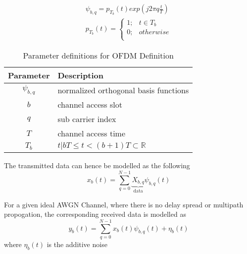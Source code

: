         \begin{equation} \label{eq:OFDM}
            \begin{split}
                \psi_{b,q} = p_{T_{b}}(t)exp(j2{\pi}q{\frac{t}{T}}) \\
                p_{T_{b}}(t) = \left\{
                    \begin{matrix}
                        1; & t \in T_b \\
                        0; & otherwise \\
                    \end{matrix}\right.
            \end{split}
        \end{equation}

        \begin{table}[H]
            \begin{center}
                \begin{tabular}{|c|l|}
                    \hline
                    Parameter& Description\\ \hline
                    $\psi_{b,q}$& normalized orthogonal basis functions\\ \hline
                    $b$& channel access slot\\ \hline
                    $q$& sub carrier index\\ \hline
                    $T$& channel access time \\ \hline
                    $T_{b}$& $ t | bT \leq t < (b + 1)T \subset \mathbb{R}$ \\ \hline
                \end{tabular}
                \caption{Parameter definitions for OFDM Definition}
                \label{tab:OFDMParam}
            \end{center}
        \end{table}


        The transmitted data can hence be modelled as the following
        \begin{equation} \label{eq:TxDataMath}
            x_b(t) = \sum_{q=0}^{N-1}\underbrace{X_{b,q}}_\text{data} \psi_{b,q}(t)
        \end{equation}

        For a given ideal AWGN Channel, where there is no delay spread or multipath propogation, the corresponding received data is modelled as
        \begin{equation} \label{eq:RxDataMathIdeal}
            y_b(t) = \sum_{q=0}^{N-1}x_b(t) \psi_{b,q}(t) +\eta_b(t)
        \end{equation}
        where $\eta_b(t)$ is the additive noise

